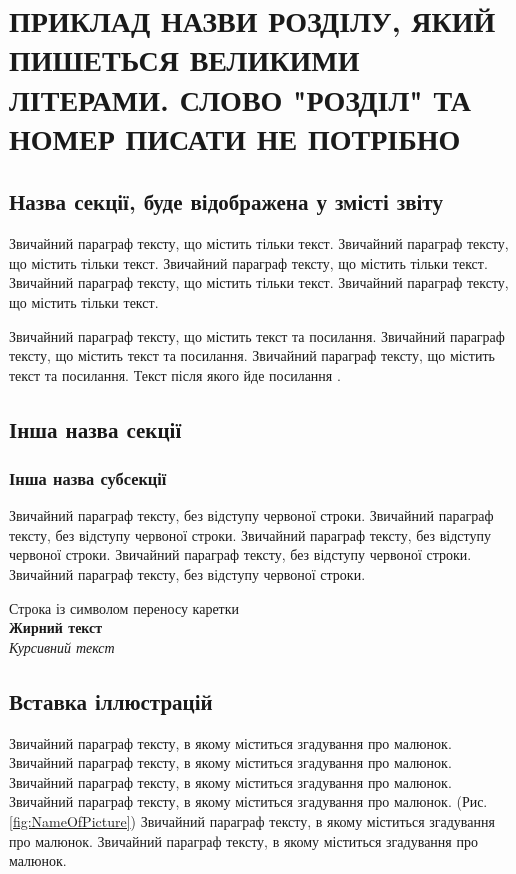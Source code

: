 \chapter{ПРИКЛАД НАЗВИ РОЗДІЛУ, ЯКИЙ ПИШЕТЬСЯ ВЕЛИКИМИ ЛІТЕРАМИ. СЛОВО "РОЗДІЛ" ТА НОМЕР ПИСАТИ НЕ ПОТРІБНО}


\section{Назва секції, буде відображена у змісті звіту}

Звичайний параграф тексту, що містить тільки текст. Звичайний параграф тексту, що містить тільки текст. Звичайний параграф тексту, що містить тільки текст. Звичайний параграф тексту, що містить тільки текст. Звичайний параграф тексту, що містить тільки текст.

Звичайний параграф тексту, що містить текст та посилання. Звичайний параграф тексту, що містить текст та посилання. Звичайний параграф тексту, що містить текст та посилання. Текст після якого йде посилання \cite{Chen2019}. 


\section{Інша назва секції}
\subsection{Інша назва субсекції}

\noindent Звичайний параграф тексту, без відступу червоної строки. Звичайний параграф тексту, без відступу червоної строки. Звичайний параграф тексту, без відступу червоної строки. Звичайний параграф тексту, без відступу червоної строки. Звичайний параграф тексту, без відступу червоної строки. %

Строка із символом переносу каретки \\ %

\noindent \textbf{Жирний текст} \\
\noindent \textit{Курсивний текст} \\

\section{Вставка іллюстрацій}

Звичайний параграф тексту, в якому міститься згадування про малюнок. Звичайний параграф тексту, в якому міститься згадування про малюнок. Звичайний параграф тексту, в якому міститься згадування про малюнок. Звичайний параграф тексту, в якому міститься згадування про малюнок. (Рис. \ref{fig:NameOfPicture}) %
Звичайний параграф тексту, в якому міститься згадування про малюнок. Звичайний параграф тексту, в якому міститься згадування про малюнок. 


